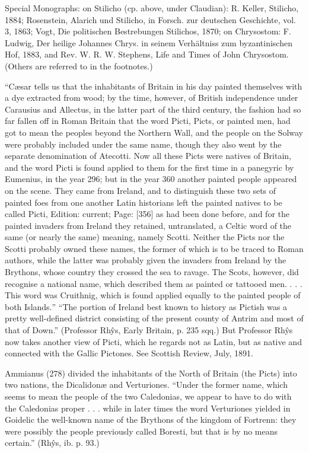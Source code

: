 Special Monographs: on Stilicho (cp. above, under Claudian): R. Keller, Stilicho, 1884; Rosenstein, Alarich und Stilicho, in Forsch. zur deutschen Geschichte, vol. 3, 1863; Vogt, Die politischen Bestrebungen Stilichos, 1870; on Chrysostom: F. Ludwig, Der heilige Johannes Chrys. in seinem Verhältniss zum byzantinischen Hof, 1883, and Rev. W. R. W. Stephens, Life and Times of John Chrysostom. (Others are referred to in the footnotes.)


\texthebrew{“}Cæsar tells us that the inhabitants of Britain in his day painted themselves with a dye extracted from wood; by the time, however, of British independence under Carausius and Allectus, in the latter part of the third century, the fashion had so far fallen off in Roman Britain that the word Picti, Picts, or painted men, had got to mean the peoples beyond the Northern Wall, and the people on the Solway were probably included under the same name, though they also went by the separate denomination of Atecotti. Now all these Picts were natives of Britain, and the word Picti is found applied to them for the first time in a panegyric by Eumenius, in the year 296; but in the year 360 another painted people appeared on the scene. They came from Ireland, and to distinguish these two sets of painted foes from one another Latin historians left the painted natives to be called Picti, Edition: current; Page: [356] as had been done before, and for the painted invaders from Ireland they retained, untranslated, a Celtic word of the same (or nearly the same) meaning, namely Scotti. Neither the Picts nor the Scotti probably owned these names, the former of which is to be traced to Roman authors, while the latter was probably given the invaders from Ireland by the Brythons, whose country they crossed the sea to ravage. The Scots, however, did recognise a national name, which described them as painted or tattooed men. . . . This word was Cruithnig, which is found applied equally to the painted people of both Islands.\texthebrew{” “}The portion of Ireland best known to history as Pictish was a pretty well-defined district consisting of the present county of Antrim and most of that of Down.\texthebrew{}” (Professor Rhŷs, Early Britain, p. 235 sqq.) But Professor Rhŷs now takes another view of Picti, which he regards not as Latin, but as native and connected with the Gallic Pictones. See Scottish Review, July, 1891.

Ammianus (278) divided the inhabitants of the North of Britain (the Picts) into two nations, the Dicalidonæ and Verturiones. \texthebrew{“}Under the former name, which seems to mean the people of the two Caledonias, we appear to have to do with the Caledonias proper . . . while in later times the word Verturiones yielded in Goidelic the well-known name of the Brythons of the kingdom of Fortrenn: they were possibly the people previously called Boresti, but that is by no means certain.\texthebrew{}” (Rhŷs, ib. p. 93.)


